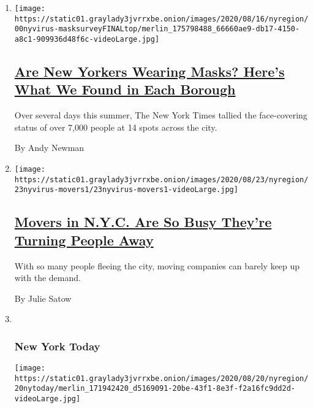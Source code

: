 \begin{enumerate}
\def\labelenumi{\arabic{enumi}.}
\item
  \texttt{[image: https://static01.graylady3jvrrxbe.onion/images/2020/08/16/nyregion/00nyvirus-masksurveyFINALtop/merlin\_175798488\_66660ae9-db17-4150-a8c1-909936d48f6c-videoLarge.jpg]}

  \hypertarget{are-new-yorkers-wearing-masks-heres-what-we-found-in-each-borough}{%
  \subsection{\texorpdfstring{\href{/2020/08/20/nyregion/nyc-face-masks.html}{Are
  New Yorkers Wearing Masks? Here's What We Found in Each
  Borough}}{Are New Yorkers Wearing Masks? Here's What We Found in Each Borough}}\label{are-new-yorkers-wearing-masks-heres-what-we-found-in-each-borough}}

  Over several days this summer, The New York Times tallied the
  face-covering status of over 7,000 people at 14 spots across the city.

  By Andy Newman
\item
  \texttt{[image: https://static01.graylady3jvrrxbe.onion/images/2020/08/23/nyregion/23nyvirus-movers1/23nyvirus-movers1-videoLarge.jpg]}

  \hypertarget{movers-in-nyc-are-so-busy-theyre-turning-people-away}{%
  \subsection{\texorpdfstring{\href{/2020/08/20/nyregion/moving-new-york-coronavirus.html}{Movers
  in N.Y.C. Are So Busy They're Turning People
  Away}}{Movers in N.Y.C. Are So Busy They're Turning People Away}}\label{movers-in-nyc-are-so-busy-theyre-turning-people-away}}

  With so many people fleeing the city, moving companies can barely keep
  up with the demand.

  By Julie Satow
\item ~
  \hypertarget{new-york-today}{%
  \subsubsection{New York Today}\label{new-york-today}}

  \texttt{[image: https://static01.graylady3jvrrxbe.onion/images/2020/08/20/nyregion/20nytoday/merlin\_171942420\_d5169091-20be-43f1-8e3f-f2a16fc9dd2d-videoLarge.jpg]}


\end{enumerate}
